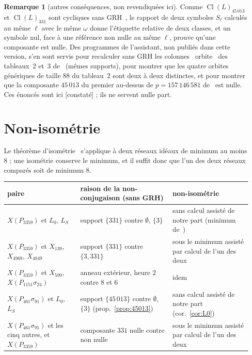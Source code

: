 \documentclass[11pt,a4paper]{amsart}
\theoremstyle{plain}
\theoremstyle{definition}
\newtheorem{remark}[theorem]{Remarque}
\DeclareMathOperator{\Cl}{Cl}
\newcommand{\Lz}{L_{0}}
\newcommand{\LS}{L_{S}}
\newcommand{\XA}{X(P_{3359})}
\newcommand{\XB}{X(P_{461}\sigma_{91})}
\newcommand{\XC}{X(P_{1151}\sigma_{24})}
\newcommand{\st}[1]{\textup{\textsf{\small[#1]}}}
\newcommand{\CONS}{\st{constaté}}
\begin{document}
\begin{remark}[autres conséquences, non revendiquées ici]\label{rem:autres}
Comme $\Cl(L)_{45\,013}$ et $\Cl(L)_{331}$ sont cycliques sans GRH~\cite[prop.~2.2]{Gau26}, le rapport de deux symboles $S_\ell$ calculés au même $\ell$ avec le même $\omega$ donne l'étiquette relative de deux classes, et un symbole nul, face à une référence non nulle au même $\ell$, prouve qu'une composante est nulle. Des programmes de l'assistant, non publiés dans cette version, s'en sont servis pour recalculer sans GRH les colonnes \guillemotleft~orbite~\guillemotright{} des tableaux~2 et~3 de~\cite{Gau26} (mêmes supports), pour montrer que les quatre orbites génériques de taille $88$ du tableau~2 sont deux à deux distinctes, et pour montrer que la composante $45\,013$ du premier au-dessus de $p=157\,146\,581$ de~\cite[\S4.5]{Gau26a} est nulle. Ces énoncés sont ici \CONS{} ; ils ne servent nulle part.
\end{remark}

\section{Non-isométrie}\label{sec:noniso}

Le théorème d'isométrie~\cite[th.~3.3]{Gau26} s'applique à deux réseaux idéaux de minimum au moins $8$ ; une isométrie conserve le minimum, et il suffit donc que l'un des deux réseaux comparés soit de minimum $8$.

\begin{center}\small\renewcommand{\arraystretch}{1.2}
\begin{tabular}{>{\raggedright\arraybackslash}p{3.6cm}>{\raggedright\arraybackslash}p{4.9cm}>{\raggedright\arraybackslash}p{5.6cm}}
\toprule
paire & raison de la non-conjugaison (sans GRH) & non-isométrie \\
\midrule
$\XA$ et $\Lz$, $\LS$ & support $\{331\}$ contre $\emptyset$, $\{3\}$ & sans calcul assisté de notre part (minimum de~\cite{Sak26}) \\
$\XA$ et $X_{139}$, $X_{4969}$, $X_{4049}$ & support $\{331\}$ contre $\{3,331\}$ & sous le minimum assisté par calcul de l'un des deux \\
$\XA$ et $X_{599}$, $\XC$ & anneau extérieur, heure $2$ contre $8$ et $6$~\cite[cor.~4.8]{Gau26a} & idem \\
$\XB$ et $\Lz$, $\LS$ & support $\{45\,013\}$ contre $\emptyset$, $\{3\}$ (prop.~\ref{prop:45013}) & sans calcul assisté de notre part (cor.~\ref{cor:L0}) \\
$\XB$ et les cinq autres, et $\XA$ & composante $331$ nulle contre non nulle & sous le minimum assisté par calcul de l'un des deux \\
\bottomrule
\end{tabular}
\end{center}
\end{document}
